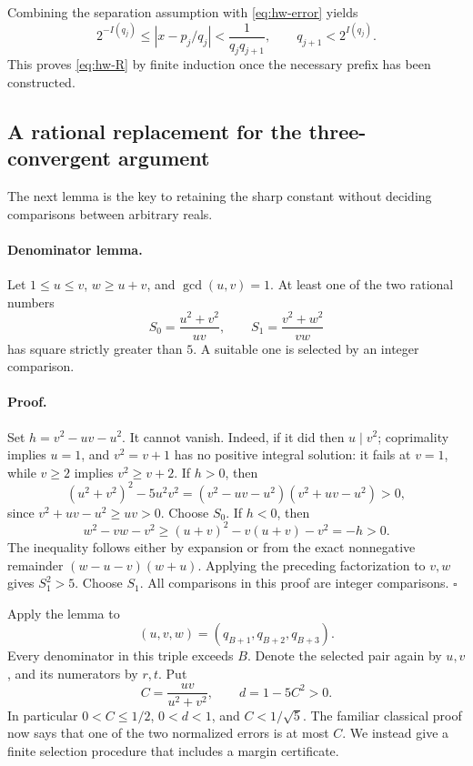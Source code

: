 Combining the separation assumption with \eqref{eq:hw-error} yields
\[
 2^{-I(q_j)}\le |x-p_j/q_j|<\frac1{q_jq_{j+1}},
 \qquad q_{j+1}<2^{I(q_j)}.
\]
This proves \eqref{eq:hw-R} by finite induction once the necessary prefix
has been constructed.

\subsection{A rational replacement for the three-convergent argument}

The next lemma is the key to retaining the sharp constant without deciding
comparisons between arbitrary reals.

\paragraph{Denominator lemma.}
Let \(1\le u\le v\), \(w\ge u+v\), and \(\gcd(u,v)=1\).
At least one of the two rational numbers
\[
 S_0=\frac{u^2+v^2}{uv},\qquad
 S_1=\frac{v^2+w^2}{vw}
\]
has square strictly greater than \(5\).  A suitable one is selected by an
integer comparison.

\paragraph{Proof.}
Set \(h=v^2-uv-u^2\).  It cannot vanish.  Indeed, if it did then
\(u\mid v^2\); coprimality implies \(u=1\), and \(v^2=v+1\) has no
positive integral solution: it fails at \(v=1\), while \(v\ge2\) implies
\(v^2\ge v+2\).
If \(h>0\), then
\[
 (u^2+v^2)^2-5u^2v^2
 =(v^2-uv-u^2)(v^2+uv-u^2)>0,
\]
since \(v^2+uv-u^2\ge uv>0\).  Choose \(S_0\).
If \(h<0\), then
\[
 w^2-vw-v^2\ge(u+v)^2-v(u+v)-v^2=-h>0.
\]
The inequality follows either by expansion or from the exact nonnegative
remainder \((w-u-v)(w+u)\).  Applying the preceding factorization to
\(v,w\) gives \(S_1^2>5\).  Choose \(S_1\).
All comparisons in this proof are integer comparisons. \hfill\(\square\)

Apply the lemma to
\[
 (u,v,w)=(q_{B+1},q_{B+2},q_{B+3}).
\]
Every denominator in this triple exceeds \(B\).  Denote the selected pair
again by \(u,v\), and its numerators by \(r,t\).  Put
\begin{equation}\label{eq:hw-margin}
 C=\frac{uv}{u^2+v^2},\qquad d=1-5C^2>0.
\end{equation}
In particular \(0<C\le1/2\), \(0<d<1\), and \(C<1/\sqrt5\).
The familiar classical proof now says that one of the two normalized
errors is at most \(C\).  We instead give a finite selection procedure
that includes a margin certificate.

